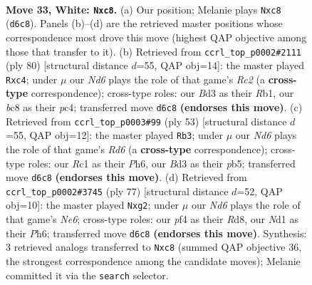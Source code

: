 \documentclass[11pt]{article}
\begin{document}
\clearpage

\begin{figure}[p]\centering
\begin{subfigure}{0.46\textwidth}\centering
\resizebox{\linewidth}{!}{%
\newchessgame
\chessboard[
  setfen={1nb5/6k1/1p1Np3/6p1/5p2/3B1P2/2P3K1/2RNr2r w - - 4 33},
  showmover=false,
  pgfstyle=straightmove, color=movearrow, markmove={d6-c8}
]}
\caption{}
\end{subfigure}\hfill
\begin{subfigure}{0.46\textwidth}\centering
\resizebox{\linewidth}{!}{%
\newchessgame
\chessboard[
  setfen={2rb2k1/5p2/6p1/1PnN3p/2pPr3/8/2R2PK1/1R6 w - - 0 41},
  showmover=false,
  pgfstyle=straightmove, color=movearrow, markmove={c2-c4}
]}
\caption{}
\end{subfigure}
\\[4pt]
\begin{subfigure}{0.46\textwidth}\centering
\resizebox{\linewidth}{!}{%
\newchessgame
\chessboard[
  setfen={8/5p1k/6pp/1P6/1B6/3r2PP/r3bP2/2R1R1K1 b - - 0 27},
  showmover=false,
  pgfstyle=straightmove, color=movearrow, markmove={d3-b3}
]}
\caption{}
\end{subfigure}\hfill
\begin{subfigure}{0.46\textwidth}\centering
\resizebox{\linewidth}{!}{%
\newchessgame
\chessboard[
  setfen={3r3k/6p1/7p/4p3/R1B2b2/P3nP2/6P1/1K5R b - - 0 39},
  showmover=false,
  pgfstyle=straightmove, color=movearrow, markmove={e3-g2}
]}
\caption{}
\end{subfigure}
\caption{\textbf{Move 33, White: \texttt{Nxc8}.} (a) Our position; Melanie plays \texttt{Nxc8} (\texttt{d6c8}). Panels (b)--(d) are the retrieved master positions whose correspondence most drove this move (highest QAP objective among those that transfer to it). (b) Retrieved from \texttt{ccrl\_top\_p0002\#2111} (ply 80) [structural distance $d$=55, QAP obj=14]: the master played \texttt{Rxc4}; under $\mu$ our \emph{Nd6} plays the role of that game's \emph{Rc2} (a \textbf{cross-type} correspondence); cross-type roles: our \emph{B}d3 as their \emph{R}b1, our \emph{b}c8 as their \emph{p}c4; transferred move \texttt{d6c8} \textbf{(endorses this move)}. (c) Retrieved from \texttt{ccrl\_top\_p0003\#99} (ply 53) [structural distance $d$=55, QAP obj=12]: the master played \texttt{Rb3}; under $\mu$ our \emph{Nd6} plays the role of that game's \emph{Rd6} (a \textbf{cross-type} correspondence); cross-type roles: our \emph{R}c1 as their \emph{P}h6, our \emph{B}d3 as their \emph{p}b5; transferred move \texttt{d6c8} \textbf{(endorses this move)}. (d) Retrieved from \texttt{ccrl\_top\_p0002\#3745} (ply 77) [structural distance $d$=52, QAP obj=10]: the master played \texttt{Nxg2}; under $\mu$ our \emph{Nd6} plays the role of that game's \emph{Ne6}; cross-type roles: our \emph{p}f4 as their \emph{R}d8, our \emph{N}d1 as their \emph{P}h6; transferred move \texttt{d6c8} \textbf{(endorses this move)}. Synthesis: 3 retrieved analogs transferred to \texttt{Nxc8} (summed QAP objective 36, the strongest correspondence among the candidate moves); Melanie committed it via the \texttt{search} selector.}
\label{fig:thought-m64}
\end{figure}
\end{document}
